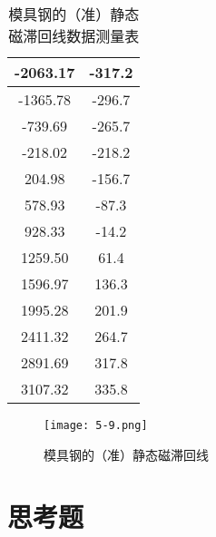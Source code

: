\documentclass[12pt]{article}
\begin{document}
\begin{table}[htbp]
\begin{tabular}{|c|c|}
        \hline
        -2063.17  & -317.2 \\
        \hline
        -1365.78  & -296.7 \\
        \hline
        -739.69  & -265.7 \\
        \hline
        -218.02  & -218.2 \\
        \hline
        204.98  & -156.7 \\
        \hline
        578.93  & -87.3 \\
        \hline
        928.33  & -14.2 \\
        \hline
        1259.50  & 61.4 \\
        \hline
        1596.97  & 136.3 \\
        \hline
        1995.28  & 201.9 \\
        \hline
        2411.32  & 264.7 \\
        \hline
        2891.69  & 317.8 \\
        \hline
        3107.32  & 335.8 \\
        \hline
        \end{tabular}%
    \caption{模具钢的（准）静态磁滞回线数据测量表}
  \end{table}%

\begin{figure}[htbp]
    \centering
    \texttt{[image: 5-9.png]}
    \caption{模具钢的（准）静态磁滞回线}
\end{figure}

\section{思考题}
\end{document}
